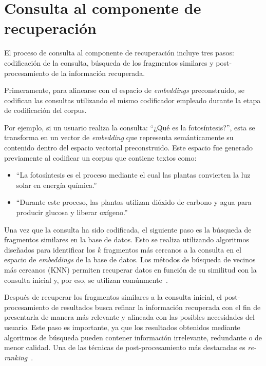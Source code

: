 \section{Consulta al componente de recuperación}

El proceso de consulta al componente de recuperación incluye tres pasos: codificación de la consulta, búsqueda de los fragmentos similares y post-procesamiento de la información recuperada.

Primeramente, para alinearse con el espacio de \textit{embeddings} preconstruido, se codifican las consultas utilizando el mismo codificador empleado durante la etapa de codificación del corpus.

Por ejemplo, si un usuario realiza la consulta:
``¿Qué es la fotosíntesis?'', esta se transforma en un vector de \textit{embedding} que representa semánticamente su contenido dentro del espacio vectorial preconstruido. Este espacio fue generado previamente al codificar un corpus que contiene textos como:
\begin{itemize} 
    \item ``La fotosíntesis es el proceso mediante el cual las plantas convierten la luz solar en energía química.'' 
    \item ``Durante este proceso, las plantas utilizan dióxido de carbono y agua para producir glucosa y liberar oxígeno.''
\end{itemize}

Una vez que la consulta ha sido codificada, el siguiente paso es la búsqueda de fragmentos similares en la base de datos. Esto se realiza utilizando algoritmos diseñados para identificar los \(k\) fragmentos más cercanos a la consulta en el espacio de \textit{embeddings} de la base de datos. Los métodos de búsqueda de vecinos más cercanos (KNN) permiten recuperar datos en función de su similitud con la consulta inicial y, por eso, se utilizan comúnmente~\cite{johnson2021billion}.

Después de recuperar los fragmentos similares a la consulta inicial, el \newline post-procesamiento de resultados busca refinar la información recuperada con el fin de presentarla de manera más relevante y alineada con las posibles necesidades del usuario. Este paso es importante, ya que los resultados obtenidos mediante algoritmos de búsqueda pueden contener información irrelevante, redundante o de menor calidad. Una de las técnicas de post-procesamiento más destacadas es \textit{re-ranking}~\cite{mortaheb2025rerankingcontextmultimodalretrieval}.

